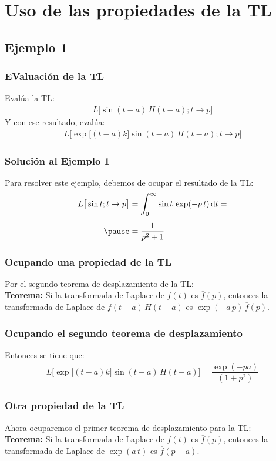 \documentclass[12pt]{beamer}
\begin{document}
\section{Uso de las propiedades de la TL}
\subsection{Ejemplo 1}

\begin{frame}
\frametitle{EValuación de la TL}
Evalúa la TL:
\pause
\begin{align*}
L \big[ \sin (t - a) \, H (t - a); t \to p  \big]
\end{align*}
\pause
Y con ese resultado, evalúa:
\pause
\begin{align*}
L \big[ \exp\big[ (t - a ) k \big] \sin (t - a) \, H (t - a); t \to p  \big]
\end{align*}
\end{frame}
\begin{frame}
\frametitle{Solución al Ejemplo 1}
Para resolver este ejemplo, debemos de ocupar el resultado de la TL:
\begin{eqnarray*}
\begin{aligned}
L \big[ \sin t ; t \to p  \big] &= \scaleint{6ex}_{\bs 0}^{\infty} \sin t \, \exp(-p \, t) \dd{t} = \\[0.5em] \pause
&= \dfrac{1}{p^{2} + 1}
\end{aligned}
\end{eqnarray*}
\end{frame}
\begin{frame}
\frametitle{Ocupando una propiedad de la TL}
Por el segundo teorema de desplazamiento de la TL:
\\
\bigskip
\pause
\noindent \textbf{Teorema: } Si la transformada de Laplace de $f(t)$ es $\overline{f}(p)$, entonces la transformada de Laplace de $f(t - a) \, H(t - a)$ es $\exp(-a \, p) \, \overline{f}(p)$.
\end{frame}
\begin{frame}
\frametitle{Ocupando el segundo teorema de desplazamiento}
Entonces se tiene que:
\begin{align*}
L \big[ \exp\big[ (t - a ) k \big] \sin (t - a) \, H (t - a) \big] = \dfrac{\exp (- p a)}{(1 + p^{2})}
\end{align*}
\end{frame}
\begin{frame}
\frametitle{Otra propiedad de la TL}
Ahora ocuparemos el primer teorema de desplazamiento para la TL:
\\
\bigskip
\pause
\noindent \textbf{Teorema: } Si la transformada de Laplace de $f(t)$ es $\overline{f}(p)$, entonces la transformada de Laplace de $\exp(a \, t)$ es $\overline{f}(p - a)$.
\end{frame}
\end{document}
